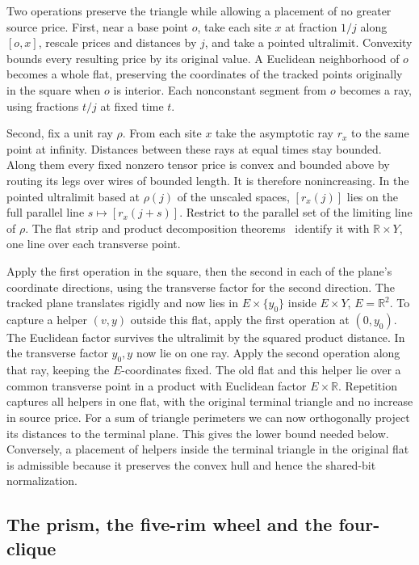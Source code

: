 \documentclass[11pt,letterpaper]{article}
\begin{document}
Two operations preserve the triangle while allowing a placement of no greater source price. First, near a base point \(o\), take each site \(x\) at fraction \(1/j\) along \([o,x]\), rescale prices and distances by \(j\), and take a pointed ultralimit. Convexity bounds every resulting price by its original value. A Euclidean neighborhood of \(o\) becomes a whole flat, preserving the coordinates of the tracked points originally in the square when \(o\) is interior. Each nonconstant segment from \(o\) becomes a ray, using fractions \(t/j\) at fixed time \(t\).

Second, fix a unit ray \(\rho\). From each site \(x\) take the asymptotic ray \(r_x\) to the same point at infinity. Distances between these rays at equal times stay bounded. Along them every fixed nonzero tensor price is convex and bounded above by routing its legs over wires of bounded length. It is therefore nonincreasing. In the pointed ultralimit based at \(\rho(j)\) of the unscaled spaces, \([r_x(j)]\) lies on the full parallel line \(s\mapsto[r_x(j+s)]\). Restrict to the parallel set of the limiting line of \(\rho\). The flat strip and product decomposition theorems~\cite[Theorems~2.9 and~2.11]{bridson-curvature} identify it with \(\mathbb R\times Y\), one line over each transverse point.

Apply the first operation in the square, then the second in each of the plane's coordinate directions, using the transverse factor for the second direction. The tracked plane translates rigidly and now lies in \(E\times\{y_0\}\) inside \(E\times Y\), \(E=\mathbb R^2\). To capture a helper \((v,y)\) outside this flat, apply the first operation at \((0,y_0)\). The Euclidean factor survives the ultralimit by the squared product distance. In the transverse factor \(y_0,y\) now lie on one ray. Apply the second operation along that ray, keeping the \(E\)-coordinates fixed. The old flat and this helper lie over a common transverse point in a product with Euclidean factor \(E\times\mathbb R\). Repetition captures all helpers in one flat, with the original terminal triangle and no increase in source price. For a sum of triangle perimeters we can now orthogonally project its distances to the terminal plane. This gives the lower bound needed below. Conversely, a placement of helpers inside the terminal triangle in the original flat is admissible because it preserves the convex hull and hence the shared-bit normalization.

\subsection{The prism, the five-rim wheel and the four-clique}\label{the-prism-the-five-rim-wheel-and-the-four-clique}
\end{document}
